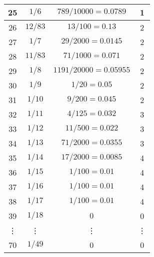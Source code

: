 \begin{table}[h]
{\begin{tabular}{|c|c|c|c|}
			\hline 
			25 & $1/6$ & $789/10000=0.0789$ & 1 \\ 
			\hline 
			26 & $12/83$ & $13/100=0.13$ & 2 \\ 
			\hline 
			27 & $1/7$ & $29/2000=0.0145$ & 2 \\ 
			\hline 
			28 & $11/83$ & $71/1000=0.071$ & 2 \\ 
			\hline 
			29 & $1/8$ & $1191/20000=0.05955$ & 2 \\ 
			\hline 
			30 & $1/9$ & $1/20=0.05$ & 2 \\ 
			\hline 
			31 & $1/10$ & $9/200=0.045$ & 2 \\ 
			\hline 
			32 & $1/11$ & $4/125=0.032$ & 3 \\ 
			\hline 
			33 & $1/12$ & $11/500=0.022$ & 3 \\ 
			\hline 
			34 & $1/13$ & $71/2000=0.0355$ & 3 \\ 
			\hline 
			35 & $1/14$ & $17/2000=0.0085$ & 4 \\ 
			\hline 
			36 & $1/15$ & $1/100=0.01$ & 4 \\ 
			\hline 
			37 & $1/16$ & $1/100=0.01$ & 4 \\ 
			\hline 
			38 & $1/17$ & $1/100=0.01$ & 4 \\ 
			\hline 
			39 & $1/18$ & $0$ & 0 \\ 
			\hline 
			\vdots & \vdots & \vdots & \vdots \\ 
			\hline
			70 & $1/49$ & 0 & 0 \\
			\hline 
		\end{tabular}
	}
\end{table} 




